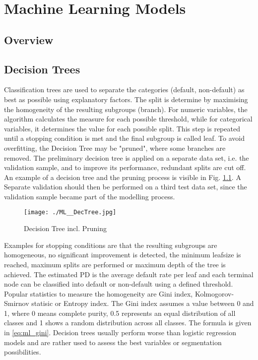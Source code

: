 \chapter{Machine Learning Models}
\section{Overview}

\section{Decision Trees}
Classification trees are used to separate the categories (default, non-default) as best as possible using explanatory factors. The split is determine by maximising the homogeneity of the resulting subgroups (branch). For numeric variables, the algorithm calculates the measure for each possible threshold, while for categorical variables, it determines the value for each possible split. This step is repeated until a stopping condition is met and the final subgroup is called leaf. To avoid overfitting, the Decision Tree may be "pruned", where some branches are removed. The preliminary decision tree is applied on a separate data set, i.e. the validation sample, and to improve its performance, redundant splits are cut off. An example of a decision tree and the pruning process is visible in Fig. \ref{fig:ml_dectree}. A Separate validation should then be performed on a third test data set, since the validation sample became part of the modelling process. 

\begin{figure}[H]
	\centering
	\texttt{[image: ./ML\_\_DecTree.jpg]}
    \caption{Decision Tree incl. Pruning}
    \label{fig:ml_dectree}
\end{figure}

Examples for stopping conditions are that the resulting subgroups are homogeneous, no significant improvement is detected, the minimum leafsize is reached, maximum splits are performed or maximum depth of the tree is achieved. The estimated PD is the average default rate per leaf and each terminal node can be classified into default or non-default using a defined threshold. Popular statistics to measure the homogeneity are Gini index, Kolmogorov-Smirnov statisic or Entropy index. The Gini index assumes a value between 0 and 1, where 0 means complete purity, 0.5 represents an equal distribution of all classes and 1 shows a random distribution across all classes. The formula is given in \ref{eq:ml_gini}. Decision trees usually perform worse than logistic regression models and are rather used to assess the best variables or segmentation possibilities. 

